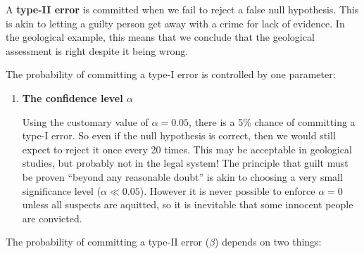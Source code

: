 A \textbf{type-II error} is committed when we fail to reject a false
null hypothesis.  This is akin to letting a guilty person get away
with a crime for lack of evidence. In the geological example, this
means that we conclude that the geological assessment is right despite
it being wrong.\medskip

The probability of committing a type-I error is controlled by one
parameter:

\begin{enumerate}
\item {\bf The confidence level $\alpha$}
  
  Using the customary value of $\alpha=0.05$, there is a 5\% chance of
  committing a type-I error. So even if the null hypothesis is
  correct, then we would still expect to reject it once every 20
  times. This may be acceptable in geological studies, but probably
  not in the legal system! The principle that guilt must be proven
  ``beyond any reasonable doubt'' is akin to choosing a very small
  significance level ($\alpha\ll{0.05}$). However it is never possible
  to enforce $\alpha=0$ unless all suspects are aquitted, so it is
  inevitable that some innocent people are convicted.
\end{enumerate}

The probability of committing a type-II error ($\beta$) depends on two
things:

